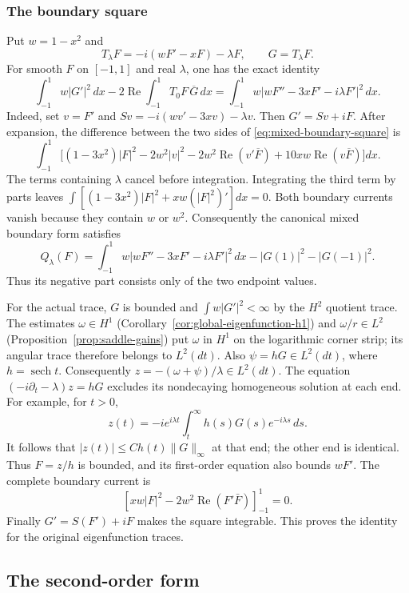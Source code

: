 \documentclass[reqno,11pt]{amsart}
\numberwithin{equation}{section}
\theoremstyle{remark}
\begin{document}
\subsubsection{The boundary square}
\label{sec:mixed-boundary-square}
Put $w=1-x^2$ and
\[
 T_\lambda F=-i(wF'-xF)-\lambda F,\qquad G=T_\lambda F.
\]
For smooth $F$ on $[-1,1]$ and real $\lambda$, one has the exact identity
\begin{equation}\label{eq:mixed-boundary-square}
 \int_{-1}^1 w|G'|^2\,dx
 -2\operatorname{Re}\int_{-1}^1 T_0F\,\overline G\,dx
 =\int_{-1}^1w|wF''-3xF'-i\lambda F'|^2\,dx.
\end{equation}
Indeed, set $v=F'$ and $Sv=-i(wv'-3xv)-\lambda v$.
Then $G'=Sv+iF$. After expansion, the difference between the
two sides of \eqref{eq:mixed-boundary-square} is
\[
 \int_{-1}^1\bigl[(1-3x^2)|F|^2-2w^2|v|^2
       -2w^2\operatorname{Re}(v'\overline F)
       +10xw\operatorname{Re}(v\overline F)\bigr]dx.
\]
The terms containing $\lambda$ cancel before integration.
Integrating the third term by parts leaves
$\int[(1-3x^2)|F|^2+xw(|F|^2)']dx=0$.
Both boundary currents vanish because they contain $w$ or $w^2$.
Consequently the canonical mixed boundary form satisfies
\[
 Q_\lambda(F)=\int_{-1}^1w|wF''-3xF'-i\lambda F'|^2\,dx
             -|G(1)|^2-|G(-1)|^2.
\]
Thus its negative part consists only of the two endpoint values.

For the actual trace, $G$ is bounded and $\int w|G'|^2<\infty$
by the $H^2$ quotient trace. The estimates $\omega\in H^1$
(Corollary~\ref{cor:global-eigenfunction-h1}) and
$\omega/r\in L^2$ (Proposition~\ref{prop:saddle-gains}) put $\omega$ in $H^1$ on the logarithmic
corner strip; its angular trace therefore belongs to $L^2(dt)$.
Also $\psi=hG\in L^2(dt)$, where $h=\operatorname{sech}t$.
Consequently $z=-(\omega+\psi)/\lambda\in L^2(dt)$.
The equation $(-i\partial_t-\lambda)z=hG$ excludes its nondecaying
homogeneous solution at each end. For example, for $t>0$,
\[
 z(t)=-i e^{i\lambda t}\int_t^\infty
              h(s)G(s)e^{-i\lambda s}\,ds.
\]
It follows that $|z(t)|\le C h(t)\|G\|_\infty$ at that end;
the other end is identical. Thus $F=z/h$ is bounded, and its
first-order equation also bounds $wF'$. The complete boundary
current is
\[
 [xw|F|^2-2w^2\operatorname{Re}(F'\bar F)]_{-1}^{1}=0.
\]
Finally $G'=S(F')+iF$ makes the square integrable. This proves
the identity for the original eigenfunction traces.


\subsection{The second-order form}
\end{document}
